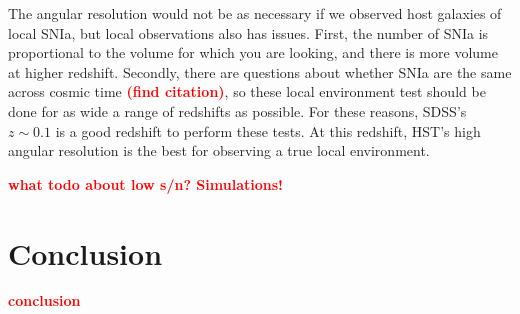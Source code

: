 \documentclass[apj, iop]{emulateapj}
\newcommand{\sn}{SNIa}
\newcommand{\todo}[1]{\textbf{\textcolor{red}{#1}}}
\begin{document}
The angular resolution would not be as necessary if we observed host galaxies of
local \sn{}, but local observations also has issues. First, the number of \sn{}
is proportional to the volume for which you are looking, and there is more
volume at higher redshift. Secondly, there are questions about whether \sn{} are
the same across cosmic time \todo{(find citation)}, so these local environment
test should be done for as wide a range of redshifts as possible. For these
reasons, SDSS's $z \sim 0.1$ is a good redshift to perform these tests. At this
redshift, HST's high angular resolution is the best for observing a true local
environment.

\todo{what todo about low s/n? Simulations!}

\section{Conclusion}

\todo{conclusion}







\end{document}
